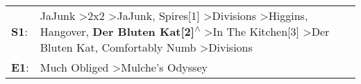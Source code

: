 \begin{supertabular}{p{0.03\textwidth}p{0.92\textwidth}}
 \textbf{S1}:  &  JaJunk\textsuperscript{} \textgreater \enspace 2x2\textsuperscript{} \textgreater \enspace JaJunk\textsuperscript{}, \enspace Spires[1]\textsuperscript{} \textgreater \enspace Divisions\textsuperscript{} \textgreater \enspace Higgins\textsuperscript{}, \enspace Hangover\textsuperscript{}, \enspace \textbf{Der Bluten Kat[2]\textsuperscript{$\wedge$}} \textgreater \enspace In The Kitchen[3]\textsuperscript{} \textgreater \enspace Der Bluten Kat\textsuperscript{}, \enspace Comfortably Numb\textsuperscript{} \textgreater \enspace Divisions\textsuperscript{}  \enspace  \\
 \textbf{E1}:  &                                                                                                                                                                                                                                                                                                                                                                                                                                                                                          Much Obliged\textsuperscript{} \textgreater \enspace Mulche's Odyssey\textsuperscript{}  \enspace  \\
\end{supertabular}
